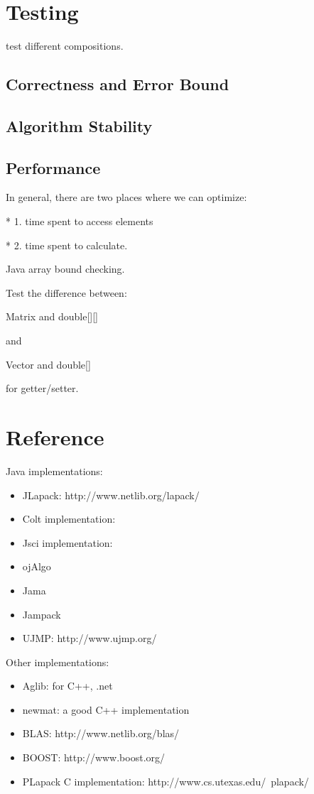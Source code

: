 \section{Testing}
test different compositions.
\subsection{Correctness and Error Bound}
\subsection{Algorithm Stability}
\subsection{Performance}
In general, there are two places where we can optimize:

     *      1. time spent to access elements

     *      2. time spent to calculate.

Java array bound checking.

Test the difference between:

Matrix and double[][]

and 

Vector and double[]

for getter/setter.
\section{Reference}

Java implementations:
\begin{itemize}
\item JLapack: http://www.netlib.org/lapack/
\item Colt implementation:
\item Jsci implementation:
\item ojAlgo
\item Jama
\item Jampack
\item UJMP: http://www.ujmp.org/
\end{itemize}

Other implementations:
\begin{itemize}
\item Aglib: for C++, .net
\item newmat: a good C++ implementation
\item BLAS: http://www.netlib.org/blas/
\item BOOST: http://www.boost.org/ 
\item PLapack C implementation: http://www.cs.utexas.edu/~plapack/
\end{itemize}

